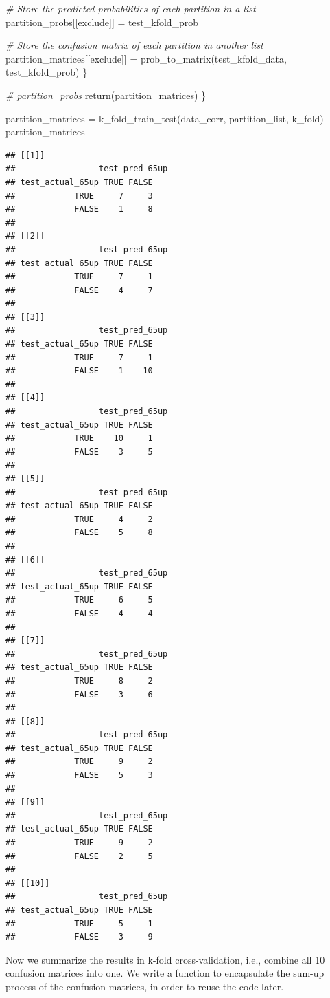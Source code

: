 \documentclass[
]{article}
\newenvironment{Shaded}{\begin{snugshade}}{\end{snugshade}}
\newcommand{\CommentTok}[1]{\textcolor[rgb]{0.56,0.35,0.01}{\textit{#1}}}
\newcommand{\FunctionTok}[1]{\textcolor[rgb]{0.00,0.00,0.00}{#1}}
\newcommand{\NormalTok}[1]{#1}
\newcommand{\OtherTok}[1]{\textcolor[rgb]{0.56,0.35,0.01}{#1}}
\begin{document}
\begin{Shaded}
\begin{Highlighting}[]
    \CommentTok{\# Store the predicted probabilities of each partition in a list}
\NormalTok{    partition\_probs[[exclude]] }\OtherTok{=}\NormalTok{ test\_kfold\_prob}
    
    \CommentTok{\# Store the confusion matrix of each partition in another list}
\NormalTok{    partition\_matrices[[exclude]] }\OtherTok{=} \FunctionTok{prob\_to\_matrix}\NormalTok{(test\_kfold\_data, test\_kfold\_prob)}
\NormalTok{  \}}
  
  \CommentTok{\# partition\_probs}
  \FunctionTok{return}\NormalTok{(partition\_matrices)}
\NormalTok{\}}

\NormalTok{partition\_matrices }\OtherTok{=} \FunctionTok{k\_fold\_train\_test}\NormalTok{(data\_corr, partition\_list, k\_fold)}
\NormalTok{partition\_matrices}
\end{Highlighting}
\end{Shaded}

\begin{verbatim}
## [[1]]
##                 test_pred_65up
## test_actual_65up TRUE FALSE
##            TRUE     7     3
##            FALSE    1     8
## 
## [[2]]
##                 test_pred_65up
## test_actual_65up TRUE FALSE
##            TRUE     7     1
##            FALSE    4     7
## 
## [[3]]
##                 test_pred_65up
## test_actual_65up TRUE FALSE
##            TRUE     7     1
##            FALSE    1    10
## 
## [[4]]
##                 test_pred_65up
## test_actual_65up TRUE FALSE
##            TRUE    10     1
##            FALSE    3     5
## 
## [[5]]
##                 test_pred_65up
## test_actual_65up TRUE FALSE
##            TRUE     4     2
##            FALSE    5     8
## 
## [[6]]
##                 test_pred_65up
## test_actual_65up TRUE FALSE
##            TRUE     6     5
##            FALSE    4     4
## 
## [[7]]
##                 test_pred_65up
## test_actual_65up TRUE FALSE
##            TRUE     8     2
##            FALSE    3     6
## 
## [[8]]
##                 test_pred_65up
## test_actual_65up TRUE FALSE
##            TRUE     9     2
##            FALSE    5     3
## 
## [[9]]
##                 test_pred_65up
## test_actual_65up TRUE FALSE
##            TRUE     9     2
##            FALSE    2     5
## 
## [[10]]
##                 test_pred_65up
## test_actual_65up TRUE FALSE
##            TRUE     5     1
##            FALSE    3     9
\end{verbatim}

Now we summarize the results in k-fold cross-validation, i.e., combine
all 10 confusion matrices into one. We write a function to encapsulate
the sum-up process of the confusion matrices, in order to reuse the code
later.
\end{document}
